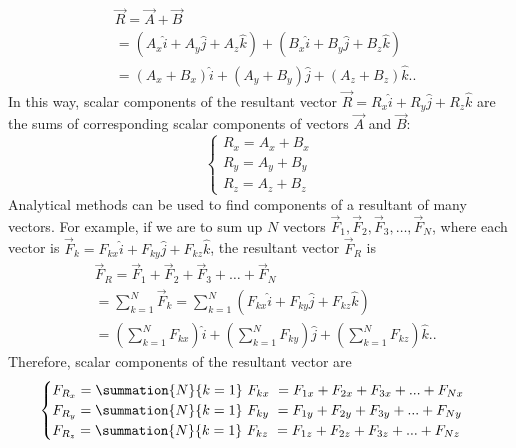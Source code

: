 \documentclass{report}
\begin{document}
        \begin{align*}
            &\vec{R} = \vec{A} + \vec{B} \\
            &= (A_x\hat{i} + A_y\hat{j} + A_z\hat{k}) + (B_x\hat{i} + B_y\hat{j} + B_z\hat{k}) \\
            &= (A_x + B_x)\hat{i} + (A_y + B_y)\hat{j} + (A_z + B_z)\hat{k}.
        .\end{align*}
        \bigbreak \noindent 
        In this way, scalar components of the resultant vector $\vec{R} = R_x\hat{i} + R_y\hat{j} + R_z\hat{k}$ are the sums of corresponding scalar components of vectors $\vec{A}$ and $\vec{B}$:
        \bigbreak \noindent 
           \begin{equation}
                \begin{cases}
                    R_{x} = A_{x}  + B_{x} \\
                    R_{y} = A_{y}  + B_{y} \\
                    R_{z} = A_{z}  + B_{z} 
                \end{cases}
            \end{equation}
        \bigbreak \noindent 
        Analytical methods can be used to find components of a resultant of many vectors. For example, if we are to sum up $N$ vectors $\vec{F}_1, \vec{F}_2, \vec{F}_3, \ldots, \vec{F}_N$, where each vector is $\vec{F}_k = F_{kx}\hat{i} + F_{ky}\hat{j} + F_{kz}\hat{k}$, the resultant vector $\vec{F}_R$ is
        \begin{align*}
            &\vec{F}_R = \vec{F}_1 + \vec{F}_2 + \vec{F}_3 + \ldots + \vec{F}_N  \\
            &= \sum_{k=1}^{N} \vec{F}_k = \sum_{k=1}^{N} (F_{kx}\hat{i} + F_{ky}\hat{j} + F_{kz}\hat{k})  \\
            &= \left( \sum_{k=1}^{N} F_{kx} \right) \hat{i} + \left( \sum_{k=1}^{N} F_{ky} \right) \hat{j} + \left( \sum_{k=1}^{N} F_{kz} \right) \hat{k}.
        .\end{align*}
        Therefore, scalar components of the resultant vector are
        \begin{equation}
            \begin{cases}
                F_{R_{x}} = \summation{N}{k=1}\ F_{kx}\ = F_{1x} + F_{2x} + F_{3x} + ... + F_{Nx} \\
                F_{R_{y}} = \summation{N}{k=1}\ F_{ky}\ = F_{1y} + F_{2y} + F_{3y} + ... + F_{Ny} \\
                F_{R_{z}} = \summation{N}{k=1}\ F_{kz}\ = F_{1z} + F_{2z} + F_{3z} + ... + F_{Nz} \\
            \end{cases}
        \end{equation}
\end{document}
